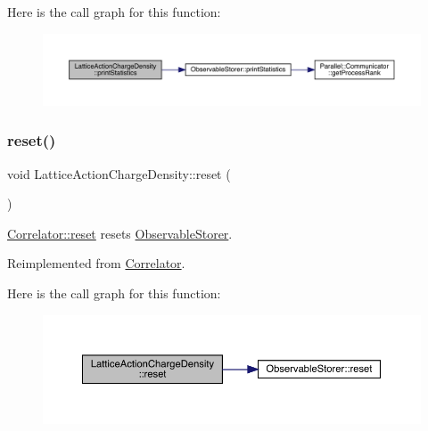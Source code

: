 Here is the call graph for this function\+:
\nopagebreak
\begin{figure}[H]
\begin{center}
\leavevmode
\includegraphics[width=350pt]{class_lattice_action_charge_density_abdaa497dd70dee58b810de7315241a56_cgraph}
\end{center}
\end{figure}
\mbox{\label{class_lattice_action_charge_density_aebbc2cc72334e7b33d9cce2ad469280b}} 
\subsubsection{\texorpdfstring{reset()}{reset()}}
{\footnotesize\ttfamily void Lattice\+Action\+Charge\+Density\+::reset (\begin{DoxyParamCaption}{ }\end{DoxyParamCaption})\hspace{0.3cm}{\ttfamily [virtual]}}



\mbox{\hyperlink{class_correlator_aacca40262d2cd62f0a3964e832f948c1}{Correlator\+::reset}} resets \mbox{\hyperlink{class_observable_storer}{Observable\+Storer}}. 



Reimplemented from \mbox{\hyperlink{class_correlator_aacca40262d2cd62f0a3964e832f948c1}{Correlator}}.

Here is the call graph for this function\+:
\nopagebreak
\begin{figure}[H]
\begin{center}
\leavevmode
\includegraphics[width=350pt]{class_lattice_action_charge_density_aebbc2cc72334e7b33d9cce2ad469280b_cgraph}
\end{center}
\end{figure}
\mbox{\label{class_lattice_action_charge_density_a21d608703811d2814e7f654588eaa0c0}} 
